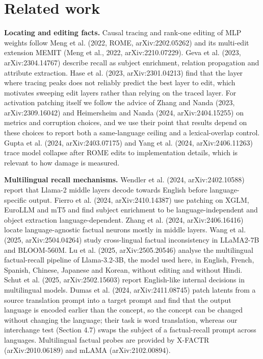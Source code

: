 \documentclass[11pt]{article}
\begin{document}
\section{Related work}
\textbf{Locating and editing facts.} Causal tracing and rank-one editing of MLP weights follow Meng et al. (2022, ROME, arXiv:2202.05262) and its multi-edit extension MEMIT (Meng et al., 2022, arXiv:2210.07229). Geva et al. (2023, arXiv:2304.14767) describe recall as subject enrichment, relation propagation and attribute extraction. Hase et al. (2023, arXiv:2301.04213) find that the layer where tracing peaks does not reliably predict the best layer to edit, which motivates sweeping edit layers rather than relying on the traced layer. For activation patching itself we follow the advice of Zhang and Nanda (2023, arXiv:2309.16042) and Heimersheim and Nanda (2024, arXiv:2404.15255) on metrics and corruption choices, and we use their point that results depend on these choices to report both a same-language ceiling and a lexical-overlap control. Gupta et al. (2024, arXiv:2403.07175) and Yang et al. (2024, arXiv:2406.11263) trace model collapse after ROME edits to implementation details, which is relevant to how damage is measured.

\textbf{Multilingual recall mechanisms.} Wendler et al. (2024, arXiv:2402.10588) report that Llama-2 middle layers decode towards English before language-specific output. Fierro et al. (2024, arXiv:2410.14387) use patching on XGLM, EuroLLM and mT5 and find subject enrichment to be language-independent and object extraction language-dependent. Zhang et al. (2024, arXiv:2406.16416) locate language-agnostic factual neurons mostly in middle layers. Wang et al. (2025, arXiv:2504.04264) study cross-lingual factual inconsistency in LLaMA2-7B and BLOOM-560M. Lu et al. (2025, arXiv:2505.20546) analyse the multilingual factual-recall pipeline of Llama-3.2-3B, the model used here, in English, French, Spanish, Chinese, Japanese and Korean, without editing and without Hindi. Schut et al. (2025, arXiv:2502.15603) report English-like internal decisions in multilingual models. Dumas et al. (2024, arXiv:2411.08745) patch latents from a source translation prompt into a target prompt and find that the output language is encoded earlier than the concept, so the concept can be changed without changing the language; their task is word translation, whereas our interchange test (Section 4.7) swaps the subject of a factual-recall prompt across languages. Multilingual factual probes are provided by X-FACTR (arXiv:2010.06189) and mLAMA (arXiv:2102.00894).
\end{document}
